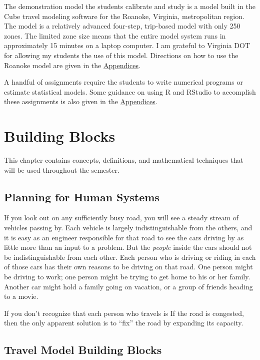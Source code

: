 \documentclass[]{book}
\begin{document}
The demonstration model the students calibrate and study is a model built in the
Cube travel modeling software for the Roanoke, Virginia, metropolitan region.
The model is a relatively advanced four-step, trip-based model with only 250
zones. The limited zone size means that the entire model system runs in
approximately 15 minutes on a laptop computer. I am grateful to Virginia DOT for
allowing my students the use of this model. Directions on how to use the Roanoke
model are given in the \protect\hyperlink{app-demomodel}{Appendices}.

A handful of assignments require the students to write numerical programs or
estimate statistical models. Some guidance on using R and RStudio to accomplish
these assignments is also given in the \protect\hyperlink{app-rstudio}{Appendices}.

\hypertarget{chap-blocks}{%
\chapter{Building Blocks}\label{chap-blocks}}

This chapter contains concepts, definitions, and mathematical techniques that will
be used throughout the semester.

\hypertarget{planning-for-human-systems}{%
\section{Planning for Human Systems}\label{planning-for-human-systems}}

If you look out on any sufficiently busy road, you will see a steady stream of
vehicles passing by. Each vehicle is largely indistinguishable from the others,
and it is easy as an engineer responsible for that road to see the cars driving
by as little more than an input to a problem. But the \emph{people} inside the cars
should not be indistinguishable from each other. Each person who is driving or
riding in each of those cars has their own reasons to be driving on that road.
One person might be driving to work; one person might be trying to get home to
his or her family. Another car might hold a family going on vacation, or a group
of friends heading to a movie.

If you don't recognize that each person who travels is
If the road is congested, then the
only apparent solution is to ``fix'' the road by expanding its capacity.

\hypertarget{travel-model-building-blocks}{%
\section{Travel Model Building Blocks}\label{travel-model-building-blocks}}
\end{document}
